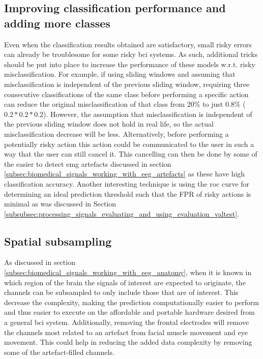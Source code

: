 
\subsection{Improving classification performance and adding more classes}
\label{subsec:online_bci_system_different_common_steps_better_classi} 


Even when the classification results obtained are satisfactory, small risky errors can already be troublesome for some risky \gls{bci} systems.
As such, additional tricks should be put into place to increase the performance of these models w.r.t. risky misclassification.
For example, if using sliding windows and assuming that misclassification is independent of the previous sliding window, requiring three consecutive classifications of the same class before performing a specific action can reduce the original misclassification of that class from 20\% to just 0.8\% ($0.2*0.2*0.2$).
However, the assumption that misclassification is independent of the previous sliding window does not hold in real life, so the actual misclassification decrease will be less.
Alternatively, before performing a potentially risky action this action could be communicated to the user in such a way that the user can still cancel it.
This cancelling can then be done by some of the easier to detect \gls{emg} artefacts discussed in section \ref{subsec:biomedical_signals_working_with_eeg_artefacts} as these have high classification accuracy.
Another interesting technique is using the \gls{roc} curve for determining an ideal prediction threshold such that the FPR of risky actions is minimal as was discussed in Section \ref{subsubsec:processing_signals_evaluating_and_using_evaluation_valtest}.


\subsection{Spatial subsampling}
\label{subsec:online_bci_system_different_common_steps_subsampling} 

As discussed in section \ref{subsec:biomedical_signals_working_with_eeg_anatomy}, when it is known in which region of the brain the signals of interest are expected to originate, the channels can be subsampled to only include those that are of interest.
This decrease the complexity, making the prediction computationally easier to perform and thus easier to execute on the affordable and portable hardware desired from a general \gls{bci} system.
Additionally, removing the frontal electrodes will remove the channels most related to an artefact from facial muscle movement and eye movement.
This could help in reducing the added data complexity by removing some of the artefact-filled channels.

